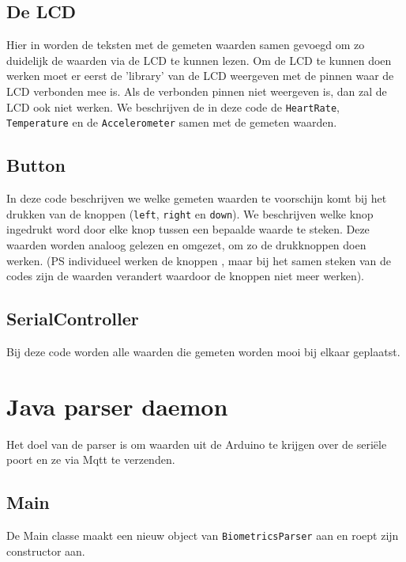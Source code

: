 \documentclass[a4paper]{report}
\newcommand{\code}[1]{\colorbox{light-gray}{\texttt{#1}}}
\begin{document}
            \subsection{De LCD}
                Hier in worden de teksten met de gemeten waarden samen gevoegd om zo duidelijk de waarden via de LCD \cite{lcd1} te kunnen lezen.
                Om de LCD \cite{lcd1} te kunnen doen werken moet er eerst de 'library' van de LCD \cite{lcd1} weergeven met de pinnen waar de LCD \cite{lcd1} verbonden mee is.
                Als de verbonden pinnen niet weergeven is, dan zal de LCD \cite{lcd1} ook niet werken.
                We beschrijven de in deze code de \code{HeartRate}, \code{Temperature} en de \code{Accelerometer} samen met de gemeten waarden.
                
            \subsection{Button}
                In deze code beschrijven we welke gemeten waarden te voorschijn komt bij het drukken van de knoppen \cite{lcd1} (\code{left}, \code{right} en \code{down}).
                We beschrijven welke knop \cite{lcd1} ingedrukt word door elke knop tussen een bepaalde waarde te steken.
                Deze waarden worden analoog gelezen en omgezet, om zo de drukknoppen \cite{lcd1} doen werken.
                (PS individueel werken de knoppen \cite{lcd1}, maar bij het samen steken van de codes zijn de waarden verandert waardoor de knoppen niet meer werken).
                
            \subsection{SerialController}
                Bij deze code worden alle waarden die gemeten worden mooi bij elkaar geplaatst.
                
    \section{Java parser daemon}
        Het doel van de parser is om waarden uit de Arduino te krijgen over de seri\"ele poort en ze via Mqtt te verzenden.

        \subsection{Main}
            De Main classe maakt een nieuw object van \code{BiometricsParser} aan en roept zijn constructor aan.
\end{document}
